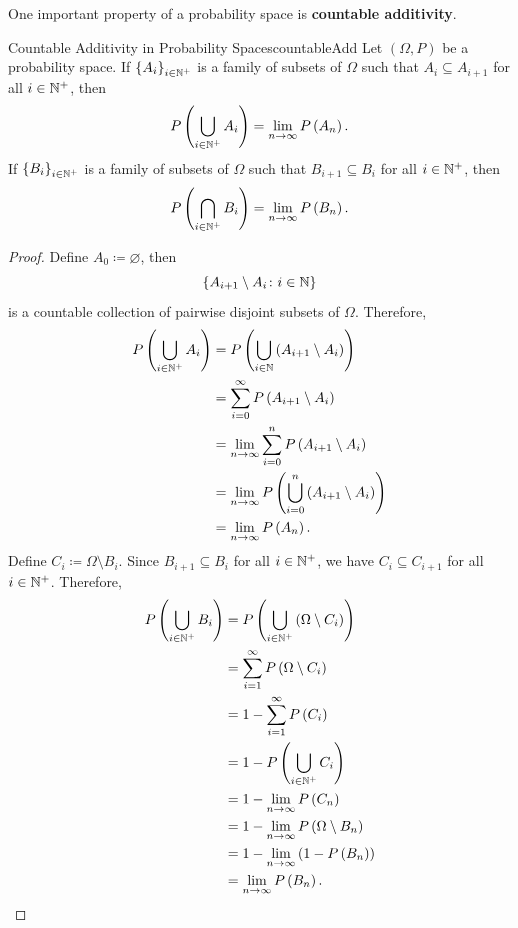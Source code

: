 \documentclass[math, code]{amznotes}
\theoremstyle{remark}
\begin{document}
One important property of a probability space is \textbf{countable additivity}. 
\begin{probox}{Countable Additivity in Probability Spaces}{countableAdd}
    Let $\left(\Omega, P\right)$ be a probability space. If $\left\{A_i\right\}_{i \in \mathbb{N}^+}$ is a family of subsets of $\Omega$ such that $A_i \subseteq A_{i + 1}$ for all $i \in \mathbb{N}^+$, then 
    \begin{equation*}
        P\left(\bigcup_{i \in \mathbb{N}^+}A_i\right) = \lim_{n \to \infty}P\left(A_n\right).
    \end{equation*}
    If $\left\{B_i\right\}_{i \in \mathbb{N}^+}$ is a family of subsets of $\Omega$ such that $B_{i + 1} \subseteq B_i$ for all $i \in \mathbb{N}^+$, then 
    \begin{equation*}
        P\left(\bigcap_{i \in \mathbb{N}^+}B_i\right) = \lim_{n \to \infty}P\left(B_n\right).
    \end{equation*}
    \tcblower
    \begin{proof}
        Define $A_0 \coloneqq \varnothing$, then 
        \begin{equation*}
            \left\{A_{i + 1} \setminus A_i \colon i \in \mathbb{N}\right\}
        \end{equation*}
        is a countable collection of pairwise disjoint subsets of $\Omega$. Therefore, 
        \begin{align*}
            P\left(\bigcup_{i \in \mathbb{N}^+}A_i\right) & = P\left(\bigcup_{i \in \mathbb{N}}\left(A_{i + 1} \setminus A_i\right)\right) \\
            & = \sum_{i = 0}^{\infty}P\left(A_{i + 1}\setminus A_i\right) \\
            & = \lim_{n \to \infty}\sum_{i = 0}^{n}P\left(A_{i + 1}\setminus A_i\right) \\
            & = \lim_{n \to \infty}P\left(\bigcup_{i = 0}^n\left(A_{i + 1}\setminus A_i\right)\right) \\
            & = \lim_{n \to \infty}P\left(A_n\right).
        \end{align*}
        Define $C_i \coloneqq \Omega \setminus B_i$. Since $B_{i + 1} \subseteq B_i$ for all $i \in \mathbb{N}^+$, we have $C_{i} \subseteq C_{i + 1}$ for all $i \in \mathbb{N}^+$. Therefore, 
        \begin{align*}
            P\left(\bigcup_{i \in \mathbb{N}^+}B_i\right) & = P\left(\bigcup_{i \in \mathbb{N}^+}\left(\Omega\setminus C_i\right)\right) \\
            & = \sum_{i = 1}^{\infty}P\left(\Omega \setminus C_i\right) \\
            & = 1 - \sum_{i = 1}^{\infty}P\left(C_i\right) \\
            & = 1 - P\left(\bigcup_{i \in \mathbb{N}^+} C_i\right) \\
            & = 1 - \lim_{n \to \infty}P\left(C_n\right) \\
            & = 1 - \lim_{n \to \infty}P\left(\Omega \setminus B_n\right) \\
            & = 1 - \lim_{n \to \infty}\left(1 - P\left(B_n\right)\right) \\
            & = \lim_{n \to \infty}P\left(B_n\right).
        \end{align*}
    \end{proof}
\end{probox}
\end{document}

